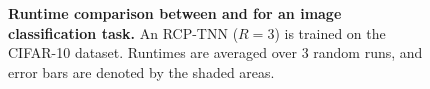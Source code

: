 \begin{figure}[!htbp]
\vspace{-1em}
\begin{minipage}[b]{.5\linewidth}
\centering
\resizebox{\textwidth}{!}{
   
    }
\label{fig:imagecls-rcp-vs-pytorch-train}
\vspace{-1em}
\end{minipage}%
\hfill
\begin{minipage}[b]{.5\linewidth}
\centering
\resizebox{\textwidth}{!}{
    
    }
\label{fig:imagecls-rcp-vs-pytorch-test}
\vspace{-1em}
\end{minipage}
\vspace{-1em}
\caption{\textbf{Runtime comparison between \conveinsum and \pytorch for an image classification task.} An RCP-TNN ($R=3$) is trained on the CIFAR-10 dataset. Runtimes are averaged over 3 random runs, and error bars are denoted by the shaded areas.}\label{fig:imagecls-rcp-vs-pytorch}
\vspace{-1em}
\end{figure}
